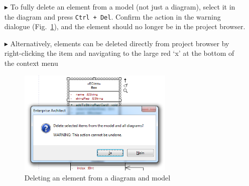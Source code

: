 \begin{itemize}
\item[$\blacktriangleright$] To fully delete an element from a model (not just a diagram), select it in the diagram and press \texttt{Ctrl + Del}. Confirm the
action in the warning dialogue (Fig.~\ref{ea:deleteWarning}), and the element should no longer be in the project browser.

\vspace{0.5cm}

\item[$\blacktriangleright$] Alternatively, elements can be deleted directly from project browser by right-clicking the item and navigating to the large
red `x' at the bottom of the context menu

\begin{figure}[htbp]
\begin{center}
  \includegraphics[width=0.7\textwidth]{ea_deleteWarning}
  \caption{Deleting an element from a diagram and model}  
  \label{ea:deleteWarning}
\end{center}
\end{figure}  

\end{itemize}
